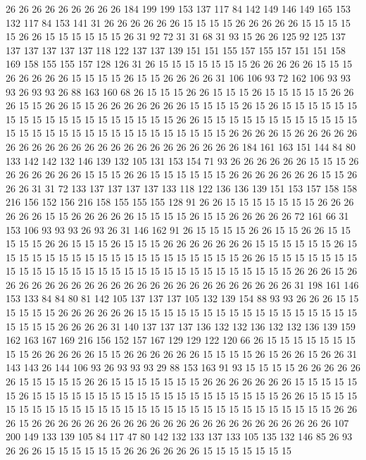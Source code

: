 26 26 26 26 26 26 26 26 26 184 199 199 153 137 117 84 142 149 146 149
165 153 132 117 84 153 141 31 26 26 26 26 26 26 15 15 15 15 26 26
26 26 26 15 15 15 15 15 26 26 15 15 15 15 15 15 26 31 92 72
31 31 68 31 93 15 26 26 125 92 125 137 137 137 137 137 137 118 122 137
137 139 151 151 155 157 155 157 151 151 158 169 158 155 155 157 128 126 31 26
15 15 15 15 15 15 15 26 26 26 26 26 15 15 15 26 26 26 26 26
15 15 15 15 26 15 15 26 26 26 26 31 106 106 93 72 162 106 93 93
93 26 93 93 26 88 163 160 68 26 15 15 15 26 26 15 15 15 26 15
15 15 15 15 26 26 26 15 15 26 26 15 15 26 26 26 26 26 26 26
15 15 15 15 26 15 26 15 15 15 15 15 15 15 15 15 15 15 15 15
15 15 15 15 15 15 26 26 15 15 15 15 15 15 15 15 15 15 15 15
15 15 15 15 15 15 15 15 15 15 15 15 15 15 15 15 15 26 26 26
26 15 26 26 26 26 26 26 26 26 26 26 26 26 26 26 26 26 26 26
26 26 26 26 26 184 161 163 151 144 84 80 133 142 142 132 146 139 132 105
131 153 154 71 93 26 26 26 26 26 26 15 15 15 26 26 26 26 26 26
26 15 15 15 26 26 15 15 15 15 15 15 26 26 26 26 26 26 26 15
15 26 26 26 31 31 72 133 137 137 137 137 133 118 122 136 136 139 151 153
157 158 158 216 156 152 156 216 158 155 155 155 128 91 26 26 15 15 15 15
15 15 15 26 26 26 26 26 26 15 15 26 26 26 26 26 15 15 15 15
26 15 15 26 26 26 26 26 72 161 66 31 153 106 93 93 93 26 93 26
31 146 162 91 26 15 15 15 15 26 26 15 15 26 26 15 15 15 15 15
26 26 15 15 15 26 15 15 15 26 26 26 26 26 26 26 15 15 15 15
15 15 26 15 15 15 15 15 15 15 15 15 15 15 15 15 15 15 15 15
15 15 26 26 15 15 15 15 15 15 15 15 15 15 15 15 15 15 15 15
15 15 15 15 15 15 15 15 15 15 15 15 15 26 26 26 15 26 26 26
26 26 26 26 26 26 26 26 26 26 26 26 26 26 26 26 26 26 26 26
31 198 161 146 153 133 84 84 80 81 142 105 137 137 137 105 132 139 154 88
93 93 26 26 26 15 15 15 15 15 15 26 26 26 26 26 26 15 15 15
15 15 15 15 15 15 15 15 15 15 15 15 15 15 15 15 15 15 26 26
26 26 31 140 137 137 137 136 132 132 136 132 132 136 139 159 162 163 167 169
216 156 152 157 167 129 129 122 120 66 26 15 15 15 15 15 15 15 15 15
26 26 26 26 26 15 15 26 26 26 26 26 26 15 15 15 15 26 15 26
26 15 26 26 31 143 143 26 144 106 93 26 93 93 93 29 88 153 163 91
93 15 15 15 15 26 26 26 26 26 26 15 15 15 15 15 26 26 15 15
15 15 15 15 15 26 26 26 26 26 26 26 15 15 15 15 15 15 26 15
15 15 15 15 15 15 15 15 15 15 15 15 15 15 15 15 15 15 26 26
15 15 15 15 15 15 15 15 15 15 15 15 15 15 15 15 15 15 15 15
15 15 15 15 15 15 15 15 15 26 26 26 15 26 26 26 26 26 26 26
26 26 26 26 26 26 26 26 26 26 26 26 26 26 26 26 107 200 149 133
139 105 84 117 47 80 142 132 133 137 133 105 135 132 146 85 26 93 26 26
26 15 15 15 15 15 15 26 26 26 26 26 26 15 15 15 15 15 15 15
